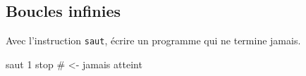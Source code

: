 %     
%     

\subsection{Boucles infinies}


Avec l'instruction \verb|saut|, écrire un programme qui ne
termine jamais.

\begin{correction}
\begin{listing}{1}
saut 1
stop # <- jamais atteint
\end{listing}
\end{correction}





